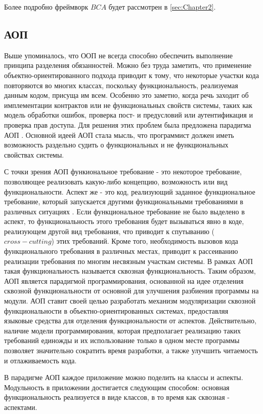 Более подробно фреймворк $BCA$ будет рассмотрен в \autoref{sec:Chapter2}.

\subsection{АОП}

Выше упоминалось, что ООП не всегда способно обеспечить выполнение принципа разделения обязанностей. Можно без труда заметить, что применение объектно-ориентированного подхода приводит к тому, что некоторые участки кода повторяются во многих классах, поскольку функциональность, реализуемая данным кодом, присуща им всем. Особенно это заметно, когда речь заходит об имплементации контрактов или не функциональных свойств системы, таких как модель обработки ошибок, проверка пост- и предусловий или аутентификация и проверка прав доступа. Для решения этих проблем была предложена парадигма АОП \cite{kiczales1997}. Основной идеей АОП стала мысль, что программист должен иметь возможность раздельно судить о функциональных и не функциональных свойствах системы.

С точки зрения АОП функиональное требование - это некоторое требование, позволяющее реализовать какую-либо концепцию, возможность или вид функциональности. Аспект же - это код, реализующий заданное функциональное требование, который запускается другими функциональными требованиями в различных ситуациях \cite{zhemzhicky}. Если функциональное требование не было выделено в аспект, то функциональность этого требования будет вызываться явно в коде, реализующем другой вид требования, что приводит к спутыванию ($cross-cutting$) этих требований. Кроме того, необходимость вызовов кода функционального требования в различных местах, приводит к рассеиванию реализации требования по многим несвязным участкам системы. В рамках АОП такая функциональность называется сквозная функциональность. Таким образом, АОП является парадигмой программирования, основанной на идее отделения сквозной функциональности от основной для улучшения разбиения программы на модули. АОП ставит своей целью разработать механизм модуляризации сквозной функциональности в объектно-ориентированных системах, предоставляя языковые средства для отделения функциональности от аспектов. Действительно, наличие модели программирования, которая предполагает реализацию таких требований единожды и их использование только в одном месте программы позволяет значительно сократить время разработки, а также улучшить читаемость и отлаживаемость кода.

В парадигме АОП каждое приложение можно поделить на классы и аспекты. Модульность в приложении достигается следующим способом: основная функциональность реализуется в виде классов, в то время как сквозная - аспектами.

